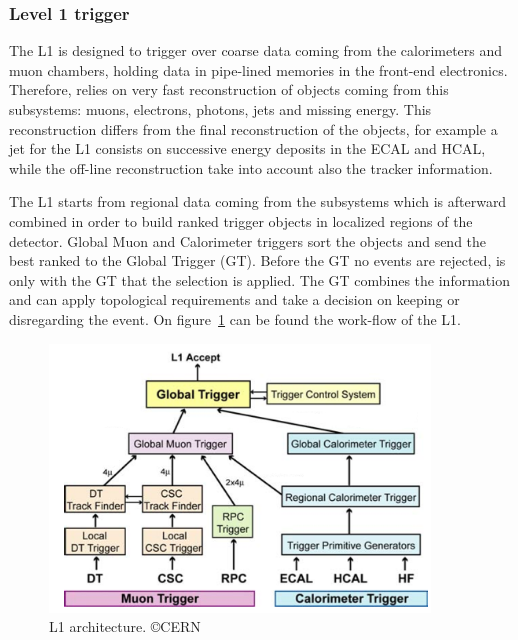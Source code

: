 \subsubsection{Level 1 trigger}
\label{sec:L1}

The L1 is designed to trigger over coarse data coming from the calorimeters and muon chambers, holding data in pipe-lined memories in the front-end electronics. Therefore, relies on very fast reconstruction of objects coming from this subsystems: muons, electrons, photons, jets and missing energy. This reconstruction differs from the final reconstruction of the objects, for example a jet for the L1 consists on successive energy deposits in the ECAL and HCAL, while the off-line reconstruction take into account also the tracker information. 

The L1 starts from regional data coming from the subsystems which is afterward combined in order to build ranked trigger objects in localized regions of the detector. Global Muon and Calorimeter triggers sort the objects and send the best ranked to the Global Trigger (GT). Before the GT no events are rejected, is only with the GT that the selection is applied. The GT combines the information and can apply topological requirements and take a decision on keeping or disregarding the event. On figure~\ref{fig:l1} can be found the work-flow of the L1. 

\begin{figure}[!Hhtbp]
  \begin{center}
    \includegraphics[width=0.9\textwidth]{figs/img_l1.png}
    \caption{L1 architecture. \copyright CERN}
    \label{fig:l1}
  \end{center}
\end{figure}

